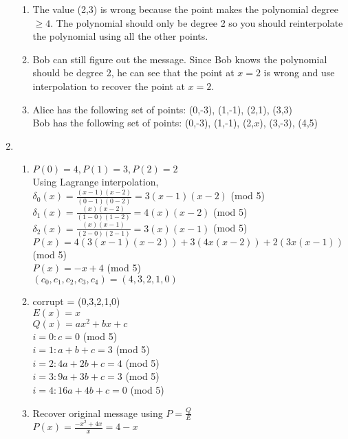 \documentclass[a4paper]{article}
\newcommand{\<}{\langle}
\renewcommand{\>}{\rangle}
\renewcommand{\^}{\wedge}
\begin{document}
\begin{enumerate}
\begin{enumerate}
            \item The value (2,3) is wrong because the point makes the polynomial degree $\geq 4$. The polynomial should only be degree 2 so you should reinterpolate the polynomial using all the other points.
            \item Bob can still figure out the message. Since Bob knows the polynomial should be degree 2, he can see that the point at $x = 2$ is wrong and use interpolation to recover the point at $x=2$.
            \item Alice has the following set of points: (0,-3), (1,-1), (2,1), (3,3)\\
            Bob has the following set of points: (0,-3), (1,-1), (2,$x$), (3,-3), (4,5)
        \end{enumerate}
    \item
        \begin{enumerate}
            \item $P(0) = 4, P(1) = 3, P(2) = 2$\\
            Using Lagrange interpolation,\\
            $\delta_0(x) = \frac{(x-1)(x-2)}{(0-1)(0-2)} = 3(x-1)(x-2)$ (mod 5)\\
            $\delta_1(x) = \frac{(x)(x-2)}{(1-0)(1-2)} = 4(x)(x-2)$ (mod 5)\\
            $\delta_2(x) = \frac{(x)(x-1)}{(2-0)(2-1)} = 3(x)(x-1)$ (mod 5)\\
            $P(x) = 4(3(x-1)(x-2)) + 3(4x(x-2)) + 2(3x(x-1))$ (mod 5)\\
            $P(x) = -x + 4$ (mod 5)\\
            $(c_0, c_1, c_2, c_3, c_4) = (4,3,2,1,0)$
            \item
            corrupt = (0,3,2,1,0)\\
            $E(x) = x$\\
            $Q(x) = ax^2 + bx + c$\\
            $i=0: c = 0$ (mod 5)\\
            $i=1: a+b+c = 3$ (mod 5)\\
            $i=2: 4a + 2b + c = 4$ (mod 5)\\
            $i=3: 9a + 3b + c = 3$ (mod 5)\\
            $i=4: 16a + 4b + c = 0$ (mod 5)
            \item
            Recover original message using $P = \frac{Q}{E}$\\
            $P(x) = \frac{-x^2 + 4x}{x} = 4-x$\\

\end{enumerate}
\end{enumerate}
\end{document}
